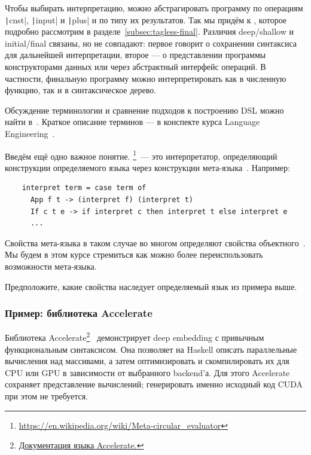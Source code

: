 Чтобы выбирать интерпретацию, можно абстрагировать программу по операциям \texttt|cnst|, \texttt|input| и \texttt|plus| и по типу их результатов.
Так мы придём к , которое подробно рассмотрим в разделе~\ref{subsec:tagless-final}.
Различия deep/shallow и initial/final связаны, но не совпадают: первое говорит о сохранении синтаксиса для дальнейшей интерпретации, второе --- о представлении программы конструкторами данных или через абстрактный интерфейс операций.
В частности, финальную программу можно интерпретировать как в численную функцию, так и в синтаксическое дерево.

Обсуждение терминологии и сравнение подходов к построению DSL можно найти в~\cite{gibbons2013functional}.
Краткое описание терминов --- в конспекте курса Language Engineering~\cite{languageEngineering}.

Введём ещё одно важное понятие.
\footnote{\url{https://en.wikipedia.org/wiki/Meta-circular_evaluator}}~--- это интерпретатор, определяющий конструкции определяемого языка через конструкции мета-языка~\cite{reynolds1972definitional}.
Например:
\begin{verbatim}
    interpret term = case term of
      App f t -> (interpret f) (interpret t)
      If c t e -> if interpret c then interpret t else interpret e
      ...
\end{verbatim}

Свойства мета-языка в таком случае во многом определяют свойства объектного~\cite{reynolds1972definitional,reynolds1998definitional}.
Мы будем в этом курсе стремиться как можно более переиспользовать возможности мета-языка.

\begin{task}
    Предположите, какие свойства наследует определяемый язык из примера выше.
\end{task}

\subsubsection{Пример: библиотека Accelerate}

Библиотека Accelerate\footnote{\href{https://www.acceleratehs.org/documentation/users-guide/language.html}{Документация языка Accelerate.}}~\cite[глава 6]{marlow2011parallel} демонстрирует deep embedding с привычным функциональным синтаксисом.
Она позволяет на Haskell описать параллельные вычисления над массивами, а затем оптимизировать и скомпилировать их для CPU или GPU в зависимости от выбранного backend'а.
Для этого Accelerate сохраняет представление вычислений; генерировать именно исходный код CUDA при этом не требуется.

